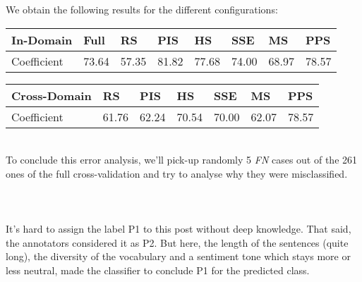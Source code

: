 We obtain the following results for the different configurations:
\begin{table}[h]
\centering
\begin{tabular}{|l|l|l|l|l|l|l|l|}
\hline
In-Domain   & Full  & RS    & PIS   & HS    & SSE   & MS    & PPS   \\ \hline
Coefficient & 73.64 & 57.35 & 81.82 & 77.68 & 74.00 & 68.97 & 78.57 \\ \hline
\end{tabular}
\end{table}
\begin{table}[h]
\centering
\begin{tabular}{|l|l|l|l|l|l|l|}
\hline
Cross-Domain & RS    & PIS   & HS    & SSE   & MS    & PPS   \\ \hline
Coefficient  & 61.76 & 62.24 & 70.54 & 70.00 & 62.07 & 78.57 \\ \hline
\end{tabular}
\end{table}
\\
To conclude this error analysis, we'll pick-up randomly 5 \emph{FN} cases out of the 261 ones of the full cross-validation and try to analyse why they were misclassified.
\\
\\
\\
\\
It's hard to assign the label P1 to this post without deep knowledge. That said, the annotators considered it as P2. But here, the length of the sentences (quite long), the diversity of the vocabulary and a sentiment tone which stays more or less neutral, made the classifier to conclude P1 for the predicted class.
\\
\\
